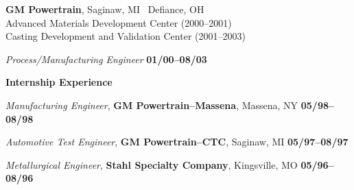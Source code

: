 {\bf GM Powertrain}, Saginaw, MI \textbar~Defiance, OH  \\ 
Advanced Materials Development Center (2000--2001) \\
Casting Development and Validation Center (2001--2003) \\
\vspace*{-.1in}
\begin{list1}
\item[] {\em Process/Manufacturing Engineer} \hfill {\bf 01/00--08/03}
\end{list1}

{\bf Internship Experience} \\
\vspace*{-.1in}
\begin{list1}
\item[] {\em Manufacturing Engineer}, {\bf GM Powertrain--Massena}, Massena, NY \hfill {\bf 05/98--08/98}
\item[] {\em Automotive Test Engineer}, {\bf GM Powertrain--CTC}, Saginaw, MI \hfill {\bf 05/97--08/97}
\item[] {\em Metallurgical Engineer}, {\bf Stahl Specialty Company}, Kingsville, MO \hfill {\bf 05/96--08/96}
\end{list1}

